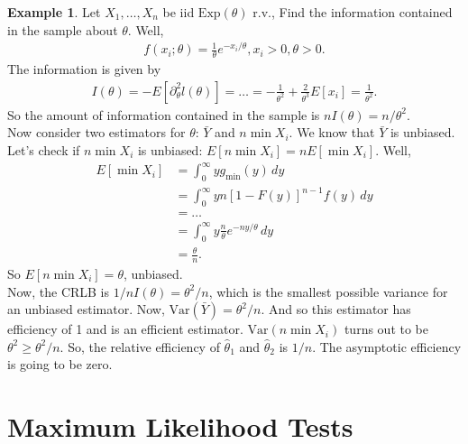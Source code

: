 \documentclass{book}
\theoremstyle{definition}
\newtheorem{exmp}{Example}[section]
\newcommand{\p}{\partial}
\newcommand{\nn}{\nonumber}
\newcommand{\Var}{\text{Var}}
\newcommand{\f}[2]{\frac{#1}{#2}}
\begin{document}
\begin{exmp}
	Let $X_1,\dots,X_n$ be iid $\text{Exp}(\theta)$ r.v., Find the information contained in the sample about $\theta$. Well, 
	\begin{align}
	f(x_i;\theta) = \f{1}{\theta}e^{-x_i/\theta}, x_i >0, \theta > 0. 
	\end{align}
	The information is given by
	\begin{align}
	I(\theta) = - E[\p^2_\theta l(\theta)] = \dots = -\f{1}{\theta^2} + \f{2}{\theta^3}E[x_i] = \f{1}{\theta^2}.
	\end{align}
	So the amount of information contained in the sample is $nI(\theta) = n/\theta^2$. \\
	
	Now consider two estimators for $\theta$: $\bar{Y}$ and $n \min X_i$. We know that $\bar{Y}$ is unbiased. Let's check if $n \min X_i$ is unbiased: $E[n \min X_i] = n E [\min X_i]$. Well,
	\begin{align}
	E [\min X_i] &= \int^\infty_0 y g_{\min} (y)\,dy\nn\\
	&= \int^\infty_0 y n [1 - F(y)]^{n-1} f(y)\,dy\nn\\
	&= \dots\nn\\
	&= \int^\infty_0 y \f{n}{\theta}e^{-ny/\theta}\,dy\nn\\
	&= \f{\theta}{n}.
	\end{align}
	So $E[n \min X_i] = \theta$, unbiased. \\
	
	Now, the CRLB is $1/nI(\theta) = \theta^2/n$, which is the smallest possible variance for an unbiased estimator. Now, $\Var(\bar{Y}) = \theta^2/n$. And so this estimator has efficiency of 1 and is an efficient estimator. $\Var(n \min X_i)$ turns out to be $\theta^2 \geq \theta^2/n$. So, the relative efficiency of $\hat\theta_1$ and $\hat\theta_2$ is $1/n$. The asymptotic efficiency is going to be zero. 
\end{exmp}









\section{Maximum Likelihood Tests}
\end{document}

